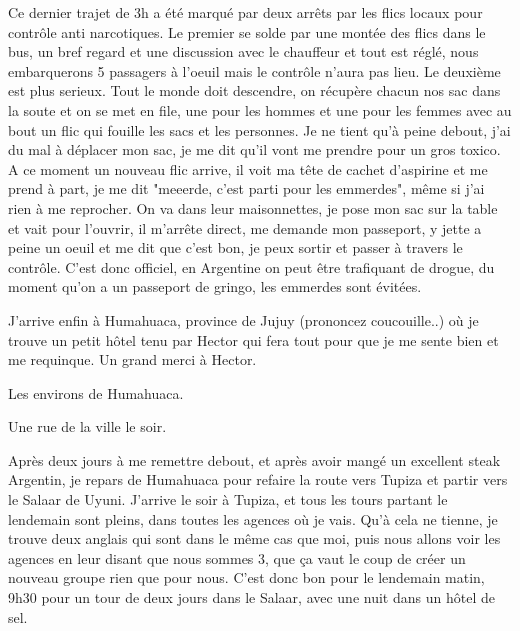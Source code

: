 \begin{multicols}{2}
Ce dernier trajet de 3h a été marqué par deux arrêts par les flics locaux pour contrôle anti narcotiques. Le premier se solde par une montée des flics dans le bus, un bref regard et une discussion avec le chauffeur et tout est réglé, nous embarquerons 5 passagers à l'oeuil mais le contrôle n'aura pas lieu. Le deuxième est plus serieux. Tout le monde doit descendre, on récupère chacun nos sac dans la soute et on se met en file, une pour les hommes et une pour les femmes avec au bout un flic qui fouille les sacs et les personnes. Je ne tient qu'à peine debout, j'ai du mal à déplacer mon sac, je me dit qu'il vont me prendre pour un gros toxico. A ce moment un nouveau flic arrive, il voit ma tête de cachet d'aspirine et me prend à part, je me dit "meeerde, c'est parti pour les emmerdes", même si j'ai rien à me reprocher. On va dans leur maisonnettes, je pose mon sac sur la table et vait pour l'ouvrir, il m'arrête direct, me demande mon passeport, y jette a peine un oeuil et me dit que c'est bon, je peux sortir et passer à travers le contrôle. C'est donc officiel, en Argentine on peut être trafiquant de drogue, du moment qu'on a un passeport de gringo, les emmerdes sont évitées.

J'arrive enfin à Humahuaca, province de Jujuy (prononcez coucouille..) où je trouve un petit hôtel tenu par Hector qui fera tout pour que je me sente bien et me requinque. Un grand merci à Hector.


Les environs de Humahuaca.


Une rue de la ville le soir.


Après deux jours à me remettre debout, et après avoir mangé un excellent steak Argentin, je repars de Humahuaca pour refaire la route vers Tupiza et partir vers le Salaar de Uyuni. J'arrive le soir à Tupiza, et tous les tours partant le lendemain sont pleins, dans toutes les agences où je vais. Qu'à cela ne tienne, je trouve deux anglais qui sont dans le même cas que moi, puis nous allons voir les agences en leur disant que nous sommes 3, que ça vaut le coup de créer un nouveau groupe rien que pour nous. C'est donc bon pour le lendemain matin, 9h30 pour un tour de deux jours dans le Salaar, avec une nuit dans un hôtel de sel.


\end{multicols}
